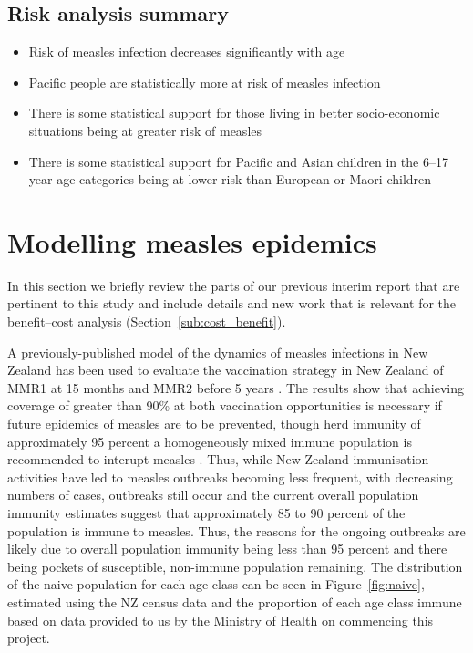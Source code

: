 \documentclass{article}
\begin{document}
\subsection{Risk analysis summary}
\begin{itemize}
\item Risk of measles infection decreases significantly with age
\item Pacific people are statistically more at risk of measles infection
\item There is some statistical support for those living in better socio-economic situations being at greater risk of measles
\item There is some statistical support for Pacific and Asian children in the 6--17 year age categories being at lower risk than European or Maori children
\end{itemize}

\section{Modelling measles epidemics}
\label{sec:epidemic_modelling}

In this section we briefly review the parts of our previous interim report that are pertinent to this study and include details and new work that is relevant for the benefit--cost analysis (Section~\ref{sub:cost_benefit}). 

A previously-published model of the dynamics of measles infections in New Zealand has been used to evaluate the vaccination strategy in New Zealand of MMR1 at 15 months and MMR2 before 5 years \citep{roberts0,roberts4,tobias98}. The results show that achieving coverage of greater than 90\% at both vaccination opportunities is necessary if future epidemics of measles are to be prevented, though herd immunity of approximately 95 percent a homogeneously mixed immune population is recommended to interupt measles \citep{roberts0,roberts4}. Thus, while New Zealand immunisation activities have led to measles outbreaks becoming less frequent, with decreasing numbers of cases, outbreaks still occur and the current overall population immunity estimates suggest that approximately 85 to 90 percent of the population is immune to measles. Thus, the reasons for the ongoing outbreaks are likely due to overall population immunity being less than 95 percent and there being pockets of susceptible, non-immune population remaining. The distribution of the naive population for each age class can be seen in Figure~\ref{fig:naive}, estimated using the NZ census data \citep{stats14} and the proportion of each age class immune based on data provided to us by the Ministry of Health on commencing this project.
\end{document}
